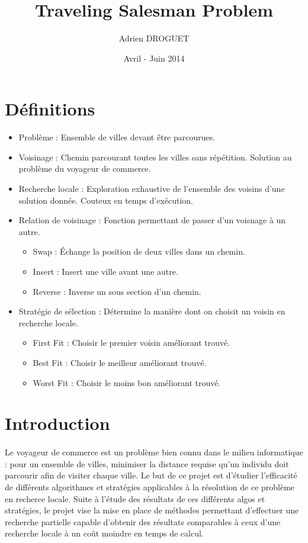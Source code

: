 \documentclass[a4paper,10pt]{report}
\title{Traveling Salesman Problem}
\author{Adrien DROGUET}
\date{Avril - Juin 2014}
\begin{document}
\maketitle

\tableofcontents
\pagebreak

\section{Définitions}
\begin{itemize}
 \item Problème : Ensemble de villes devant être parcourues.
 \item Voisinage : Chemin parcourant toutes les villes sans répétition. Solution au problème du voyageur de commerce.
 \item Recherche locale : Exploration exhaustive de l'ensemble des voisins d'une solution donnée.
 Couteux en temps d'exécution.
 \item Relation de voisinage : Fonction permettant de passer d'un voisnage à un autre.
 \begin{itemize}
  \item Swap : Échange la position de deux villes dans un chemin.
  \item Insert : Insert une ville avant une autre.
  \item Reverse : Inverse un sous section d'un chemin.
 \end{itemize}
 \item Stratégie de sélection : Détermine la manière dont on choisit un voisin en recherche locale.
 \begin{itemize}
  \item First Fit : Choisir le premier voisin améliorant trouvé.
  \item Best Fit : Choisir le meilleur améliorant trouvé.
  \item Worst Fit : Choisir le moins bon améliorant trouvé.
 \end{itemize}
\end{itemize}


\section{Introduction}

\paragraph{} %
  Le voyageur de commerce est un problème bien connu dans le milieu informatique : pour un ensemble de villes,
minimiser la distance requise qu'un individu doit parcourir afin de visiter chaque ville. Le but de ce projet
est d'étudier l'efficacité de différents algorithmes et stratégies applicables à la résolution de ce problème
en recherce locale. Suite à l'étude des résultats de ces différents algos et stratégies, le projet vise la mise
en place de méthodes permettant d'effectuer une recherche partielle capable d'obtenir des résultats comparables
à ceux d'une recherche locale à un coût moindre en temps de calcul.
\end{document}
